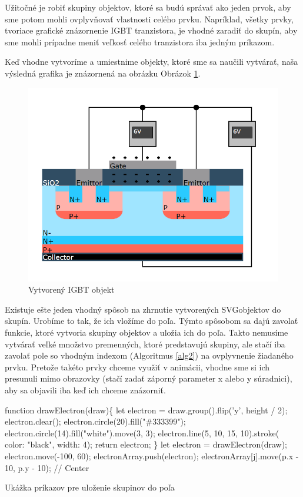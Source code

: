 Užitočné je robiť skupiny objektov, ktoré sa budú správať ako jeden prvok, aby sme potom mohli ovplyvňovať vlastnosti celého prvku. Napríklad, všetky prvky,  tvoriace grafické znázornenie \acrshort{IGBT} tranzistora, je vhodné zaradiť do skupín, aby sme mohli prípadne meniť  veľkosť celého tranzistora iba jedným príkazom.

Keď vhodne vytvoríme a umiestnime objekty, ktoré sme sa naučili vytvárať, naša výsledná grafika je znázornená na obrázku Obrázok \ref{IGBT2}.

\begin{figure}[!htbp]
    \centering
    \includegraphics[width=12cm]{img/igbt.PNG}
    \caption{Vytvorený IGBT objekt}
    \label{IGBT2}
\end{figure}

Existuje ešte jeden vhodný spôsob na zhrnutie vytvorených \acrshort{SVG}objektov do skupín. Urobíme to tak,  že ich vložíme do poľa. Týmto spôsobom sa dajú zavolať funkcie, ktoré vytvoria skupiny objektov a uložia ich do poľa. Takto nemusíme vytvárať veľké množstvo premenných, ktoré predstavujú skupiny, ale stačí iba zavolať pole so vhodným indexom (Algoritmus \ref{alg2}) na ovplyvnenie žiadaného prvku. Pretože takéto prvky chceme využiť v animácii, vhodne sme si ich presunuli mimo obrazovky (stačí zadať záporný parameter x alebo y súradnici), aby sa objavili iba keď ich chceme znázorniť.

\begin{algorithm}
\begin{algorithmic}

\STATE function drawElectron(draw)\{
\STATE \tab let electron = draw.group().flip('y', height / 2);
\STATE \tab electron.clear();
\STATE \tab electron.circle(20).fill("\#333399");
\STATE \tab electron.circle(14).fill("white").move(3, 3);
\STATE \tab electron.line(5, 10, 15, 10).stroke({ color: "black", width: 4});
\STATE \tab return electron;
\STATE\}
\STATE
\STATE  let electron = drawElectron(draw);
\STATE  electron.move(-100, 60);
\STATE  electronArray.push(electron);
\STATE 
\STATE electronArray[j].move(p.x - 10, p.y - 10);              // Center 
\caption{Ukážka príkazov pre uloženie skupinov do poľa}  
\label{alg2}
\end{algorithmic}
\end{algorithm}


